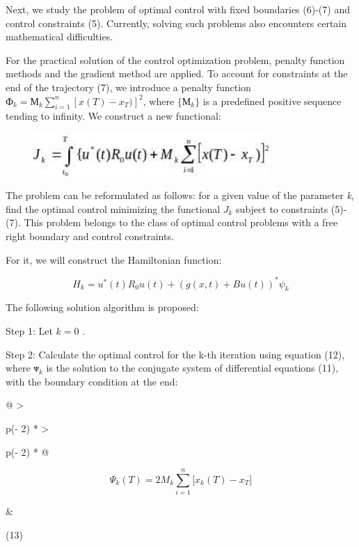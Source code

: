 Next, we study the problem of optimal control with fixed boundaries
(6)-(7) and control constraints (5). Currently, solving such problems
also encounters certain mathematical difficulties.

For the practical solution of the control optimization problem, penalty
function methods and the gradient method are applied. To account for
constraints at the end of the trajectory (7), we introduce a penalty
function
\(Ф_{k} = М_{k}\sum_{i = 1}^{n}\left\lbrack x(T) - x_{T}) \right\rbrack^{2}\),
where \(\{ М_{k}\}\) is a predefined positive sequence tending to
infinity. We construct a new functional:

\begin{figure}[H]
	\centering
	\includegraphics[width=0.8\textwidth]{assets/150}
	\caption*{}
\end{figure}

The problem can be reformulated as follows: for a given value of the
parameter \emph{k}, find the optimal control minimizing the functional
\(J_{k}\)\hspace{0pt} subject to constraints (5)-(7). This problem
belongs to the class of optimal control problems with a free right
boundary and control constraints.

For it, we will construct the Hamiltonian function:

\[H_{k} = u^{*}(t)R_{0}u(t) + (g(x,t) + Bu(t))^{*}\psi_{k}\]

The following solution algorithm is proposed:

Step 1: Let \(k = 0\) .

Step 2: Calculate the optimal control for the k-th iteration using
equation (12), where \(ᴪ_{k}\) is the solution to the conjugate system
of differential equations (11), with the boundary condition at the end:

\begin{longtable}[]{@{}
  >{\raggedright\arraybackslash}p{(\columnwidth - 2\tabcolsep) * }
  >{\raggedright\arraybackslash}p{(\columnwidth - 2\tabcolsep) * }@{}}
\toprule\noalign{}
\begin{minipage}[b]{\linewidth}\raggedright
\[\Psi_{k}(T) = 2M_{k}\sum_{i = 1}^{n}{\lbrack x_{k}(T) - x_{T}\rbrack}\]
\end{minipage} & \begin{minipage}[b]{\linewidth}\raggedright
(13)
\end{minipage} \\
\midrule\noalign{}
\endhead
\bottomrule\noalign{}
\endlastfoot
\end{longtable}

